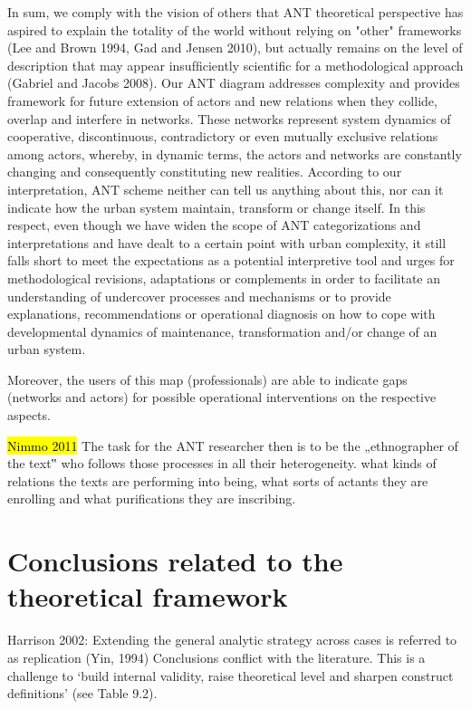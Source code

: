 \documentclass[11pt]{report}
\begin{document}
In sum, we comply with the vision of others that ANT theoretical perspective has aspired to explain the totality of the world without relying on "other" frameworks (Lee and Brown 1994, Gad and Jensen 2010), but actually remains on the level of description that may appear insufﬁciently scientiﬁc for a methodological approach (Gabriel and Jacobs 2008). Our ANT diagram addresses complexity and provides framework for future extension of actors and new relations when they collide, overlap and interfere in networks. These networks represent system dynamics of cooperative, discontinuous, contradictory or even mutually exclusive relations among actors, whereby, in dynamic terms, the actors and networks are constantly changing and consequently constituting new realities. According to our interpretation, ANT scheme neither can tell us anything about this, nor can it indicate how the urban system maintain, transform or change itself. In this respect, even though we have widen the scope of ANT categorizations and interpretations and have dealt to a certain point with urban complexity, it still falls short to meet the expectations as a potential interpretive tool and urges for methodological revisions, adaptations or complements in order to facilitate an understanding of undercover processes and mechanisms or to provide explanations, recommendations or operational diagnosis on how to cope with developmental dynamics of maintenance, transformation and/or change of an urban system.

Moreover, the users of this map (professionals) are able to indicate gaps (networks and actors) for possible operational interventions on the respective aspects.

\hl{Nimmo 2011}
The  task  for  the  ANT  researcher  then  is  to  be  the „ethnographer  of  the  text‟  who  follows  those processes in all their heterogeneity. 
what kinds of relations the texts  are  performing  into  being,  what  sorts  of  actants  they  are  enrolling  and  what purifications  they  are inscribing. 

\section{Conclusions related to the theoretical framework}

Harrison 2002:
Extending the general analytic strategy across cases is referred to as replication (Yin, 1994)
Conclusions conflict with the literature. This is a challenge to
‘build internal validity, raise theoretical level and sharpen construct definitions’ (see Table 9.2).
\end{document}
